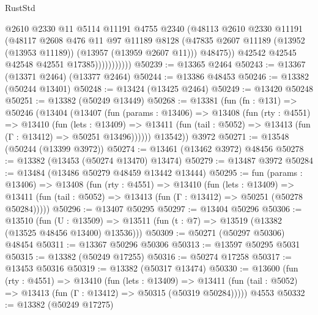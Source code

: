 \begin{lexlean}{RustStd}
\begin{coremodule}
                          @2610
                          @2330
                          @11
                          @5114
                          @11191
                          @4755
                          @2340
                          (@48113
                            @2610
                            @2330
                            @11191
                            (@48117
                              @2608
                              @476
                              @11
                              @97
                              @11189
                              @8128
                              (@47835
                                @2607
                                @11189
                                (@13952 (@13953 @11189))
                                (@13957 (@13959 @2607 @11)))
                              @48475))
                          @42542
                          @42545
                          @42548
                          @42551
                          @17385)))))))))))
@50239 := @13365 @2464
@50243 := @13367 (@13371 @2464) (@13377 @2464)
@50244 := @13386 @48453
@50246 := @13382 (@50244 @13401)
@50248 := @13424 (@13425 @2464)
@50249 := @13420 @50248
@50251 := @13382 (@50249 @13449)
@50268 := @13381
    (fun (fn : @131) =>
    @50246
      (@13404
        (@13407
          (fun (params : @13406) =>
          @13408
            (fun (rty : @4551) =>
            @13410
              (fun (lets : @13409) =>
              @13411 (fun (tail : @5052) => @13413 (fun (Γ : @13412) => @50251 @13496))))))
        @13542))
    @3972
@50271 := @13548 (@50244 (@13399 @3972))
@50274 := @13461 (@13462 @3972) @48456
@50278 := @13382 (@13453 (@50274 @13470) @13474)
@50279 := @13487 @3972
@50284 := @13484 (@13486 @50279 @48459 @13442 @13444)
@50295 := fun (params : @13406) =>
  @13408
    (fun (rty : @4551) =>
    @13410
      (fun (lets : @13409) =>
      @13411 (fun (tail : @5052) => @13413 (fun (Γ : @13412) => @50251 (@50278 @50284)))))
@50296 := @13407 @50295
@50297 := @13404 @50296
@50306 := @13510
    (fun (U : @13509) => @13511 (fun (t : @7) => @13519 (@13382 (@13525 @48456 @13400) @13536)))
@50309 := @50271 (@50297 @50306) @48454
@50311 := @13367 @50296 @50306
@50313 := @13597 @50295 @5031
@50315 := @13382 (@50249 @17255)
@50316 := @50274 @17258
@50317 := @13453 @50316
@50319 := @13382 (@50317 @13474)
@50330 := @13600
    (fun (rty : @4551) =>
    @13410
      (fun (lets : @13409) =>
      @13411 (fun (tail : @5052) => @13413 (fun (Γ : @13412) => @50315 (@50319 @50284)))))
    @4553
@50332 := @13382 (@50249 @17275)

\end{coremodule}
\end{lexlean}
